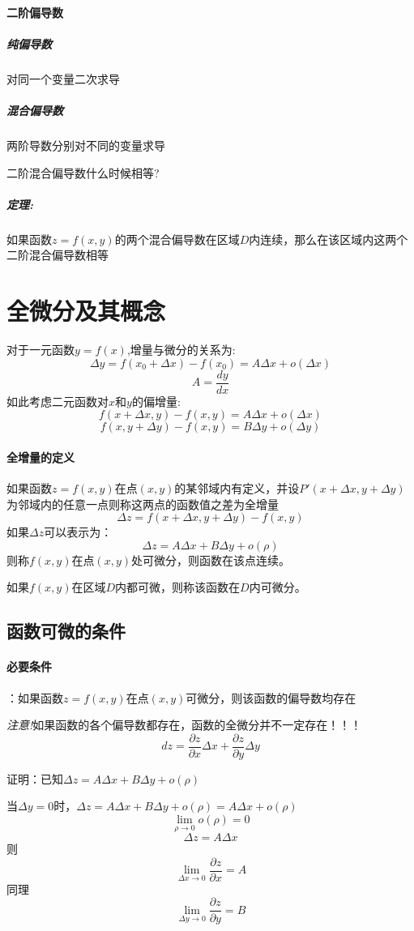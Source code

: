 \documentclass{ctexart}
\begin{document}
        \paragraph{二阶偏导数}
        \subparagraph{纯偏导数}
          对同一个变量二次求导
        \subparagraph{混合偏导数}
          两阶导数分别对不同的变量求导

          二阶混合偏导数什么时候相等?
        \subparagraph{定理:}如果函数$z=f(x,y)$的两个混合偏导数在区域$D$内连续，那么在该区域内这两个二阶混合偏导数相等
  \section{全微分及其概念}
        对于一元函数$y=f(x)$,增量与微分的关系为:
          $$\Delta y = f(x_0+\Delta x) - f(x_0)=A\Delta x + o(\Delta x)$$
          $$A=\frac{dy}{dx}$$
        如此考虑二元函数对$x$和$y$的偏增量:
          $$f(x+\Delta x,y) - f(x,y) = A\Delta x + o(\Delta x)$$
          $$f(x,y+\Delta y) - f(x,y) = B\Delta y + o(\Delta y)$$
        \paragraph{全增量的定义}
          如果函数$z=f(x,y)$在点$(x,y)$的某邻域内有定义，并设$P'(x+\Delta x,y+\Delta y)$为邻域内的任意一点则称这两点的函数值之差为全增量
          $$\Delta z = f(x+\Delta x,y+\Delta y) - f(x,y) $$
          如果$\Delta z$可以表示为：
          $$\Delta z= A\Delta x + B\Delta y + o(\rho)$$
          则称$f(x,y)$在点$(x,y)$处可微分，则函数在该点连续。 
          
          如果$f(x,y)$在区域$D$内都可微，则称该函数在$D$内可微分。
        \subsection{函数可微的条件}
          \paragraph{必要条件}：如果函数$z=f(x,y)$在点$(x,y)$可微分，则该函数的偏导数均存在

          \emph{注意!}如果函数的各个偏导数都存在，函数的全微分并不一定存在！！！
          $$dz = \frac {\partial z}{\partial x} \Delta x + \frac{\partial z}{\partial y} \Delta y $$

          证明：已知$\Delta z = A \Delta x + B \Delta y + o(\rho)$
          
          当$\Delta y = 0$时，$\Delta z = A \Delta x + B \Delta y + o(\rho) = A \Delta x + o(\rho)$
          $$\lim_{\rho \to 0}{o(\rho)}=0$$
          $$\Delta z = A \Delta x$$
          则
          $$\lim_{\Delta x \to 0} {\frac{\partial z}{\partial x}} = A$$
          同理$$\lim_{\Delta y \to 0} {\frac{\partial z}{\partial y}} = B$$
\end{document}
